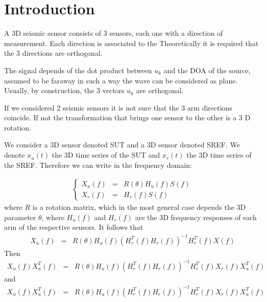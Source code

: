 \documentclass[a4paper, 12pt]{report}
\begin{document}
 \sloppy
\section{Introduction}
A 3D seismic sensor  consists of 3 sensors, each one with a direction of measurement. Each direction is associated to the Theoretically it is required that the 3 directions are orthogonal.

The signal depends of the dot product between $u_{k}$ and the DOA of the source, assumed to be faraway  in such a way the wave can be considered as plane. Usually, by construction, the 3 vectors $u_{k}$ are orthogonal.

If we considered 2 seismic sensors it is not sure that the 3 arm directions coincide. If not the transformation that brings one sensor to the other is a 3 D rotation.


We consider a 3D sensor denoted SUT and a 3D sensor denoted SREF. We denote $x_{u}(t)$ the 3D time series of the SUT and $x_{r}(t)$ the 3D time series of the SREF.  Therefore we can write in the frequency domain:

\begin{eqnarray*}
\left\{
\begin{array}{rcl}
X_{u}(f)&=&R(\theta) H_{u}(f)S(f)
\\
X_{r}(f)&=&H_{r}(f)S(f)
\end{array}\right .
\end{eqnarray*}
where $R$ is a rotation matrix, which in the most general case depends the 3D parameter $\theta$, where $H_{u}(f)$ and $H_{r}(f)$  are the 3D frequency responses of each arm of the respective sensors.
It follows that
\begin{eqnarray*}
X_{u}(f) &=&R(\theta)H_{u}(f) (H_{r}^{T}(f)H_{r}(f))^{-1}H_{r}^{T}(f)X(f)
\end{eqnarray*}
Then
\begin{eqnarray*}
X_{u}(f)X_{u}^{T}(f) &=&R(\theta)H_{u}(f) (H_{r}^{T}(f)H_{r}(f))^{-1}H_{r}^{T}(f)X_{r}(f)X_{u}^{T}(f)
\end{eqnarray*}
and
\begin{eqnarray*}
X_{u}(f)X_{u}^{T}(f) &=&R(\theta)H_{u}(f) (H_{r}^{T}(f)H_{r}(f))^{-1}H_{r}^{T}(f)X_{r}(f)X_{u}^{T}(f)
\end{eqnarray*}
\end{document}

